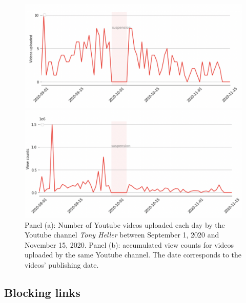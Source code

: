 \documentclass[11pt,a4paper]{article}
\begin{document}
\begin{figure}
\centering
\begin{multicols}{1}

    \includegraphics[scale=0.33]{./img/tony/fig1_tony.png}\par 
    \end{multicols}
\begin{multicols}{1}

    \includegraphics[scale=0.33]{./img/tony/fig2_tony.png}\par
\end{multicols}
\caption{Panel (a): Number of Youtube videos uploaded each day by the Youtube channel {\it Tony Heller} between September 1, 2020 and November 15, 2020. Panel (b): accumulated view counts for videos uploaded by the same Youtube channel. The date corresponds to the videos’  publishing date. 
 }
\label{fig2_oann}
\end{figure}


\subsection{Blocking links}
\end{document}
